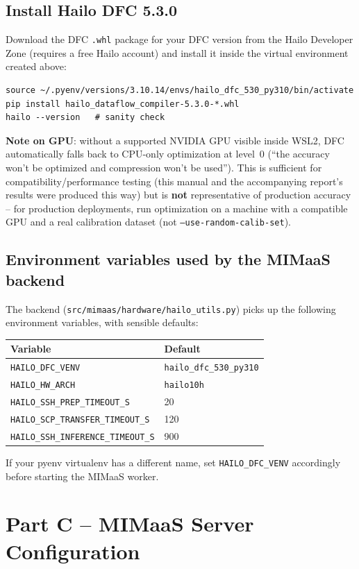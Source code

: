 \documentclass[11pt]{article}
\begin{document}
\subsection{Install Hailo DFC 5.3.0}
Download the DFC \texttt{.whl} package for your DFC version from the Hailo
Developer Zone (requires a free Hailo account) and install it inside the
virtual environment created above:
\begin{lstlisting}
source ~/.pyenv/versions/3.10.14/envs/hailo_dfc_530_py310/bin/activate
pip install hailo_dataflow_compiler-5.3.0-*.whl
hailo --version   # sanity check
\end{lstlisting}

\textbf{Note on GPU}: without a supported NVIDIA GPU visible inside WSL2,
DFC automatically falls back to CPU-only optimization at level~0
(``the accuracy won't be optimized and compression won't be used''). This is
sufficient for compatibility/performance testing (this manual and the
accompanying report's results were produced this way) but is \textbf{not}
representative of production accuracy -- for production deployments, run
optimization on a machine with a compatible GPU and a real calibration
dataset (not \texttt{--use-random-calib-set}).

\subsection{Environment variables used by the MIMaaS backend}
The backend (\texttt{src/mimaas/hardware/hailo\_utils.py}) picks up the
following environment variables, with sensible defaults:
\begin{center}
\begin{tabular}{ll}
\textbf{Variable} & \textbf{Default} \\
\hline
\texttt{HAILO\_DFC\_VENV} & \texttt{hailo\_dfc\_530\_py310} \\
\texttt{HAILO\_HW\_ARCH} & \texttt{hailo10h} \\
\texttt{HAILO\_SSH\_PREP\_TIMEOUT\_S} & 20 \\
\texttt{HAILO\_SCP\_TRANSFER\_TIMEOUT\_S} & 120 \\
\texttt{HAILO\_SSH\_INFERENCE\_TIMEOUT\_S} & 900 \\
\end{tabular}
\end{center}
If your pyenv virtualenv has a different name, set
\texttt{HAILO\_DFC\_VENV} accordingly before starting the MIMaaS worker.

\section{Part C -- MIMaaS Server Configuration}
\end{document}

